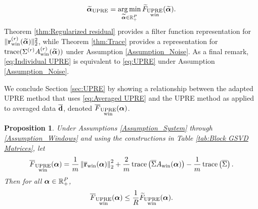 \documentclass[12pt]{article}
\newtheorem{proposition}{Proposition}[section]
\begin{document}
\[\widetilde{\bm{\alpha}}_{\text{UPRE}} = \operatorname*{arg\,min}_{\widetilde{\bm{\alpha}} \in \mathbb{R}_+^{P}} \widetilde{F}_{\substack{\text{UPRE} \\ \text{win}}}(\widetilde{\bm{\alpha}}).\]
Theorem \ref{thm:Regularized residual} provides a filter function representation for $\|\mathbf{r}_{\text{win}}^{(r)}(\widetilde{\bm{\alpha}})\|_2^2$, while Theorem \ref{thm:Trace} provides a representation for $\operatorname{trace}(\Sigma^{(r)} A_{\text{win}}^{(r)}(\widetilde{\bm{\alpha}}))$ under Assumption \ref{Assumption_Noise}. As a final remark, \eqref{eq:Individual UPRE} is equivalent to \eqref{eq:UPRE} under Assumption \ref{Assumption_Noise}. \par
We conclude Section \ref{sec:UPRE} by showing a relationship between the adapted UPRE method that uses \eqref{eq:Averaged UPRE} and the UPRE method as applied to averaged data $\overline{\mathbf{d}}$, denoted $\overline{F}_{\substack{\text{UPRE} \\ \text{win}}}(\bm{\alpha})$.

\begin{proposition}
\label{prop:UPRE Bound}
Under Assumptions \ref{Assumption_System} through \ref{Assumption_Windows} and using the constructions in Table \ref{tab:Block GSVD Matrices}, let
\begin{equation}
\overline{F}_{\substack{\text{UPRE} \\ \text{win}}}(\bm{\alpha}) = \frac{1}{m}\left\|\overline{\mathbf{r}}_{\text{win}}(\bm{\alpha})\right\|_2^2 + \frac{2}{m} \operatorname{trace}\left(\overline{\Sigma}A_{\text{win}}(\bm{\alpha})\right) - \frac{1}{m} \operatorname{trace}\left(\overline{\Sigma}\right).
\end{equation}
Then for all $\bm{\alpha} \in \mathbb{R}_{+}^{P}$,
\begin{equation}
\label{eq:UPRE Bound}
\overline{F}_{\substack{\text{UPRE} \\ \text{win}}}(\bm{\alpha}) \leq \frac{1}{R}\widetilde{F}_{\substack{\text{UPRE} \\ \text{win}}}(\bm{\alpha}).
\end{equation}
\end{proposition}
\end{document}
